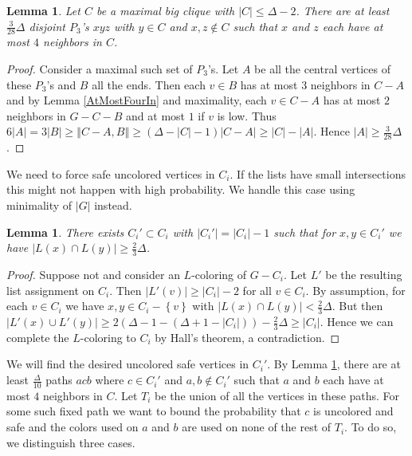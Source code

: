 \documentclass[12pt]{amsart}
\theoremstyle{plain}
\newtheorem{lem}[thm]{Lemma}
\theoremstyle{definition}
\theoremstyle{remark}
\newcommand{\set}[1]{\left\{ #1 \right\}}
\newcommand{\card}[1]{\left|#1\right|}
\newcommand{\size}[1]{\left\Vert#1\right\Vert}
\begin{document}
\begin{lem}\label{triples}
Let $C$ be a maximal big clique with $\card{C} \leq \Delta - 2$.  There are at
least $\frac{3}{28}\Delta$ disjoint $P_3$'s $xyz$ with $y \in C$ and $x, z \not
\in C$ such that $x$ and $z$ each have at most $4$ neighbors in $C$.
\end{lem}
\begin{proof}
Consider a maximal such set of $P_3$'s. Let $A$ be all the central vertices of
these $P_3$'s and $B$ all the ends.  Then each $v \in B$ has at most $3$
neighbors in $C - A$ and by Lemma \ref{AtMostFourIn} and maximality, each $v \in
C - A$ has at most $2$ neighbors in $G-C-B$ and at most $1$ if $v$ is low.  Thus
$6\card{A} = 3\card{B} \geq \size{C-A, B} \geq (\Delta - \card{C} -
1)\card{C-A} \geq \card{C} - \card{A}$.  Hence $\card{A} \geq
\frac{3}{28}\Delta$.
\end{proof}

We need to force safe uncolored vertices in $C_i$.  If the lists have small
intersections this might not happen with high probability.  We handle this case
using minimality of $\card{G}$ instead.

\begin{lem}\label{LargeIntersections}
There exists $C_i' \subset C_i$ with $\card{C_i'} = \card{C_i} - 1$ such that
for $x, y \in C_i'$ we have $\card{L(x) \cap L(y)} \geq \frac23 \Delta$.
\end{lem}
\begin{proof}
Suppose not and consider an $L$-coloring of $G - C_i$.  Let $L'$ be the
resulting list assignment on $C_i$.  Then $\card{L'(v)} \geq \card{C_i} - 2$ for
all $v \in C_i$.  By assumption, for each $v \in C_i$ we have $x, y \in C_i -
\set{v}$ with $\card{L(x) \cap L(y)} < \frac23 \Delta$.  But then $\card{L'(x) \cup
L'(y)} \geq 2(\Delta - 1 - (\Delta + 1 - \card{C_i})) - \frac23 \Delta \geq
\card{C_i}$.  Hence we can complete the $L$-coloring to $C_i$ by Hall's theorem,
a contradiction.
\end{proof}

We will find the desired uncolored safe vertices in $C_i'$.  By Lemma
\ref{triples}, there are at least $\frac{\Delta}{10}$ paths $acb$ where $c \in
C_i'$ and $a,b \not \in C_i'$ such that $a$ and $b$ each have at most $4$
neighbors in $C$.  Let $T_i$ be the union of all the vertices in these paths. 
For some such fixed path we want to bound the probability that $c$ is uncolored and safe and the colors used on $a$ and $b$ are used on
none of the rest of $T_i$.  To do so, we distinguish three cases.
\end{document}

